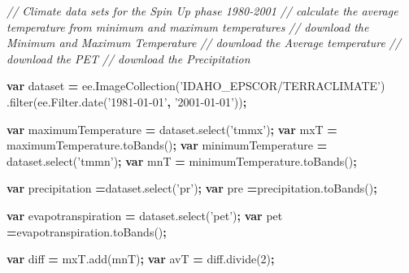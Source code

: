 \documentclass[
  10pt,
  b5paper,
]{book}
\newenvironment{Shaded}{\begin{snugshade}}{\end{snugshade}}
\newcommand{\AttributeTok}[1]{\textcolor[rgb]{0.77,0.63,0.00}{#1}}
\newcommand{\CommentTok}[1]{\textcolor[rgb]{0.56,0.35,0.01}{\textit{#1}}}
\newcommand{\DecValTok}[1]{\textcolor[rgb]{0.00,0.00,0.81}{#1}}
\newcommand{\KeywordTok}[1]{\textcolor[rgb]{0.13,0.29,0.53}{\textbf{#1}}}
\newcommand{\NormalTok}[1]{#1}
\newcommand{\OperatorTok}[1]{\textcolor[rgb]{0.81,0.36,0.00}{\textbf{#1}}}
\newcommand{\StringTok}[1]{\textcolor[rgb]{0.31,0.60,0.02}{#1}}
\newcommand{\VariableTok}[1]{\textcolor[rgb]{0.00,0.00,0.00}{#1}}
\begin{document}
\begin{Shaded}
\begin{Highlighting}[]
\CommentTok{// Climate data sets for the Spin Up phase 1980-2001}
\CommentTok{// calculate the average temperature from minimum and maximum temperatures}
\CommentTok{// download the Minimum and Maximum Temperature }
\CommentTok{// download the Average temperature}
\CommentTok{// download the PET }
\CommentTok{// download the Precipitation}

\KeywordTok{var}\NormalTok{ dataset }\OperatorTok{=} \VariableTok{ee}\NormalTok{.}\AttributeTok{ImageCollection}\NormalTok{(}\StringTok{'IDAHO_EPSCOR/TERRACLIMATE'}\NormalTok{)}
\NormalTok{                  .}\AttributeTok{filter}\NormalTok{(}\VariableTok{ee}\NormalTok{.}\VariableTok{Filter}\NormalTok{.}\AttributeTok{date}\NormalTok{(}\StringTok{'1981-01-01'}\OperatorTok{,} \StringTok{'2001-01-01'}\NormalTok{))}\OperatorTok{;}

\KeywordTok{var}\NormalTok{ maximumTemperature }\OperatorTok{=} \VariableTok{dataset}\NormalTok{.}\AttributeTok{select}\NormalTok{(}\StringTok{'tmmx'}\NormalTok{)}\OperatorTok{;}
\KeywordTok{var}\NormalTok{ mxT }\OperatorTok{=} \VariableTok{maximumTemperature}\NormalTok{.}\AttributeTok{toBands}\NormalTok{()}\OperatorTok{;}
\KeywordTok{var}\NormalTok{ minimumTemperature }\OperatorTok{=} \VariableTok{dataset}\NormalTok{.}\AttributeTok{select}\NormalTok{(}\StringTok{'tmmn'}\NormalTok{)}\OperatorTok{;}
\KeywordTok{var}\NormalTok{ mnT }\OperatorTok{=} \VariableTok{minimumTemperature}\NormalTok{.}\AttributeTok{toBands}\NormalTok{()}\OperatorTok{;}

\KeywordTok{var}\NormalTok{ precipitation }\OperatorTok{=}\VariableTok{dataset}\NormalTok{.}\AttributeTok{select}\NormalTok{(}\StringTok{'pr'}\NormalTok{)}\OperatorTok{;}
\KeywordTok{var}\NormalTok{ pre }\OperatorTok{=}\VariableTok{precipitation}\NormalTok{.}\AttributeTok{toBands}\NormalTok{()}\OperatorTok{;}

\KeywordTok{var}\NormalTok{ evapotranspiration }\OperatorTok{=} \VariableTok{dataset}\NormalTok{.}\AttributeTok{select}\NormalTok{(}\StringTok{'pet'}\NormalTok{)}\OperatorTok{;}
\KeywordTok{var}\NormalTok{ pet }\OperatorTok{=}\VariableTok{evapotranspiration}\NormalTok{.}\AttributeTok{toBands}\NormalTok{()}\OperatorTok{;}

\KeywordTok{var}\NormalTok{ diff }\OperatorTok{=} \VariableTok{mxT}\NormalTok{.}\AttributeTok{add}\NormalTok{(mnT)}\OperatorTok{;}
\KeywordTok{var}\NormalTok{ avT }\OperatorTok{=} \VariableTok{diff}\NormalTok{.}\AttributeTok{divide}\NormalTok{(}\DecValTok{2}\NormalTok{)}\OperatorTok{;}


\end{Highlighting}
\end{Shaded}
\end{document}
